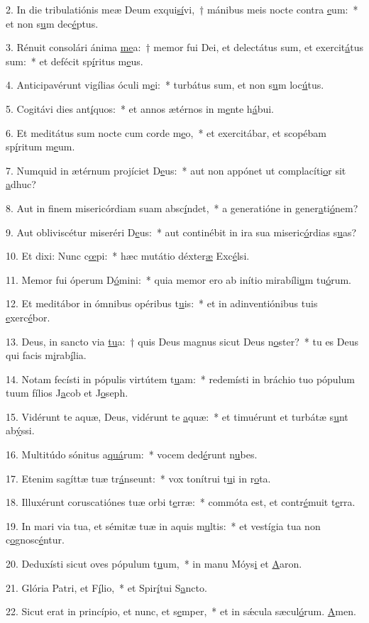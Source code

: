 2. In die tribulatiónis meæ Deum exqui\uline{sí}vi,~† mánibus meis nocte contra \uline{e}um:~* et non s\uline{u}m dec\uline{é}ptus.\par 
3. Rénuit consolári ánima \uline{me}a:~† memor fui Dei, et delectátus sum, et exercit\uline{á}tus sum:~* et defécit sp\uline{í}ritus m\uline{e}us.\par 
4. Anticipavérunt vigílias óculi m\uline{e}i:~* turbátus sum, et non s\uline{u}m loc\uline{ú}tus.\par 
5. Cogitávi dies ant\uline{í}quos:~* et annos ætérnos in m\uline{e}nte h\uline{á}bui.\par 
6. Et meditátus sum nocte cum corde m\uline{e}o,~* et exercitábar, et scopébam sp\uline{í}ritum m\uline{e}um.\par 
7. Numquid in ætérnum projíciet D\uline{e}us:~* aut non appónet ut complacíti\uline{o}r sit \uline{a}dhuc?\par 
8. Aut in finem misericórdiam suam absc\uline{í}ndet,~* a generatióne in gener\uline{a}ti\uline{ó}nem?\par 
9. Aut obliviscétur miseréri D\uline{e}us:~* aut continébit in ira sua miseric\uline{ó}rdias s\uline{u}as?\par 
10. Et dixi: Nunc c\uline{œ}pi:~* hæc mutátio déxter\uline{æ} Exc\uline{é}lsi.\par 
11. Memor fui óperum D\uline{ó}mini:~* quia memor ero ab inítio mirabíli\uline{u}m tu\uline{ó}rum.\par 
12. Et meditábor in ómnibus opéribus t\uline{u}is:~* et in adinventiónibus tuis \uline{e}xerc\uline{é}bor.\par 
13. Deus, in sancto via \uline{tu}a:~† quis Deus magnus sicut Deus n\uline{o}ster?~* tu es Deus qui facis m\uline{i}rab\uline{í}lia.\par 
14. Notam fecísti in pópulis virtútem t\uline{u}am:~* redemísti in bráchio tuo pópulum tuum fílios J\uline{a}cob et J\uline{o}seph.\par 
15. Vidérunt te aquæ, Deus, vidérunt te \uline{a}quæ:~* et timuérunt et turbátæ s\uline{u}nt ab\uline{ý}ssi.\par 
16. Multitúdo sónitus a\uline{quá}rum:~* vocem ded\uline{é}runt n\uline{u}bes.\par 
17. Etenim sagíttæ tuæ tr\uline{á}nseunt:~* vox tonítrui t\uline{u}i in r\uline{o}ta.\par 
18. Illuxérunt coruscatiónes tuæ orbi t\uline{e}rræ:~* commóta est, et contr\uline{é}muit t\uline{e}rra.\par 
19. In mari via tua, et sémitæ tuæ in aquis m\uline{u}ltis:~* et vestígia tua non c\uline{o}gnosc\uline{é}ntur.\par 
20. Deduxísti sicut oves pópulum t\uline{u}um,~* in manu Móys\uline{i} et \uline{A}aron.\par 
21. Glória Patri, et F\uline{í}lio,~* et Spir\uline{í}tui S\uline{a}ncto.\par 
22. Sicut erat in princípio, et nunc, et s\uline{e}mper,~* et in sǽcula sæcul\uline{ó}rum. \uline{A}men.\par 
